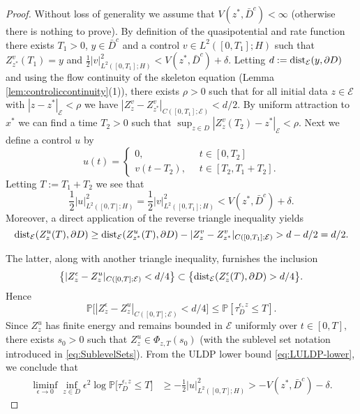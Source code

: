 \documentclass[10pt, reqno]{amsart}
\newcommand{\pr}{\mathbb{P}}
\newcommand{\e}{\mathcal{E}}
\theoremstyle{definition}
\numberwithin{lem}{section}
\numberwithin{cor}{section}
\numberwithin{prop}{section}
\numberwithin{thm}{section}
\numberwithin{dfn}{section}
\begin{document}
\begin{proof} Without loss of generality we assume that $V(z^*,  \bar{D}^c)<\infty$ (otherwise there is nothing to prove). By definition of the quasipotential and rate function there exists $T_1>0$, $y \in \bar{D}^c$ and a control $v\in L^2([0,T_1];H)$ such that  $Z_{z^*}^v(T_1)=y$ and $\tfrac{1}{2}|v|^2_{L^2([0,T_1];H)}<V(z^*, \bar{D}^c)+\delta.$ Letting $d:=\textnormal{dist}_{\e}(y, \partial D)$ and using the flow continuity of the skeleton equation (Lemma \ref{lem:controliccontinuity}(1)), there exists $\rho>0$ such that for all initial data $z\in\e$ with $|z-z^*|_\e<\rho$ we have $|Z_{z}^v-Z_{z^*}^v   |_{C([0,T_1];\e)}<d/2.$ By uniform attraction to $x^*$ we can find a time $T_2>0$ such that $\sup_{z\in D}|Z_{z}^v(T_2)-z^*    |_{\e}<\rho.$ Next we define a control $u$ by
$$  u(t)=\begin{cases} 0,&\;\; t\in [0, T_2]\\
                       v(t-T_2),&\;\; t\in [T_2, T_1+T_2].   
\end{cases}     $$
Letting $T:=T_1+T_2$ we see that $$\frac{1}{2}|u|^2_{L^2([0,T];H)}=\frac{1}{2}|v|^2_{L^2([0,T_1];H)}<V(z^*, \bar{D}^c)+\delta.$$ Moreover, a direct application of the reverse triangle inequality yields 
$$ \textnormal{dist}_{\e}(Z^u_{z}(T), \partial D)\geq  \textnormal{dist}_{\e}(Z^u_{z^*}(T), \partial D)-|Z_{z}^v-Z_{z^*}^v   |_{C([0,T_1];\e)}>d-d/2=d/2.      $$

The latter, along with another triangle inequality, furnishes the inclusion $$\big\{ |Z_{z}^{\epsilon}-Z_{z}^u   |_{C([0,T];\e)}<d/4   \big\}\subset \big\{\textnormal{dist}_{\e}(Z_z^{\epsilon}(T), \partial D)>d/4\big\}.$$ Hence 
$$\pr\bigg[  |Z_{z}^{\epsilon}-Z_{z}^{u}   |_{C([0,T];\e)}<d/4    \bigg]\leq \pr[  \tau_D^{\epsilon, z}\leq T   ].   $$
Since $Z_z^u$ has finite energy and remains bounded in $\e$ uniformly over $t\in[0,T],$ there exists $s_0>0$ such that $Z_z^u\in\Phi_{z,T}(s_0)$ (with the sublevel set notation introduced in \eqref{eq:SublevelSets}).
From the ULDP lower bound \eqref{eq:LULDP-lower}, we conclude that
\begin{equation*}
    \begin{aligned}
       \liminf_{\epsilon\to 0}\inf_{z\in D}\epsilon^2\log\pr\big[ \tau_D^{\epsilon, z}\leq T  \big]&\geq-\frac{1}{2}|u|^2_{L^2([0,T];H)} >-V(z^*, \bar{D}^c)-\delta.  
\end{aligned}
\end{equation*}\end{proof}
\end{document}
